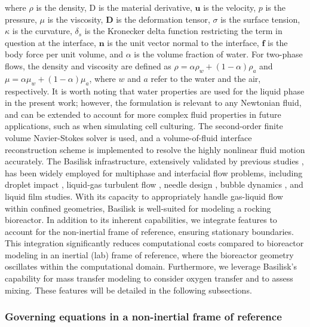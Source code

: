 \documentclass[final,3p,times,twocolumn,authoryear]{elsarticle}
\theoremstyle{definition}
\begin{document}
where $\rho$ is the density, $\mathrm{D}$ is the material derivative, $\mathbf{u}$ is the velocity, $p$ is the pressure, $\mu$ is the viscosity, $\mathbf{D}$ is the deformation tensor, $\sigma$ is the surface tension, $\kappa$ is the curvature, $\delta_s$ is the Kronecker delta function restricting the term in question at the interface, $\mathbf{n}$ is the unit vector normal to the interface, $\mathbf{f}$ is the body force per unit volume, and $\alpha$ is the volume fraction of water. For two-phase flows, the density and viscosity are defined as $\rho = \alpha\rho_w + (1-\alpha)\rho_a$ and $\mu = \alpha\mu_w + (1-\alpha)\mu_a$, where $w$ and $a$ refer to the water and the air, respectively. It is worth noting that water properties are used for the liquid phase in the present work; however, the formulation is relevant to any Newtonian fluid, and can be extended to account for more complex fluid properties in future applications, such as when simulating cell culturing. The second-order finite volume Navier-Stokes solver is used, and a volume-of-fluid interface reconstruction scheme is implemented to resolve the highly nonlinear fluid motion accurately. The Basilisk infrastructure, extensively validated by previous studies \citep{Ojiako2020,Farsoiya2021,Li2021,Hidman2022,Fudge2023,Alventosa2023,Radu2023,Xu2025}, has been widely employed for multiphase and interfacial flow problems, including droplet impact \citep{Fudge2023,Alventosa2023}, liquid-gas turbulent flow \citep{Farsoiya2021,Farsoiya2023}, needle design \citep{Radu2023}, bubble dynamics \citep{Li2021,Hidman2022}, and liquid film \citep{Ojiako2020} studies. With its capacity to appropriately handle gas-liquid flow within confined geometries, Basilisk is well-suited for modeling a rocking bioreactor. In addition to its inherent capabilities, we integrate features to account for the non-inertial frame of reference, ensuring stationary boundaries. This integration significantly reduces computational costs compared to bioreactor modeling in an inertial (lab) frame of reference, where the bioreactor geometry oscillates within the computational domain. Furthermore, we leverage Basilisk's capability for mass transfer modeling to consider oxygen transfer and to assess mixing. These features will be detailed in the following subsections.

\subsubsection{Governing equations in a non-inertial frame of reference}
\end{document}
